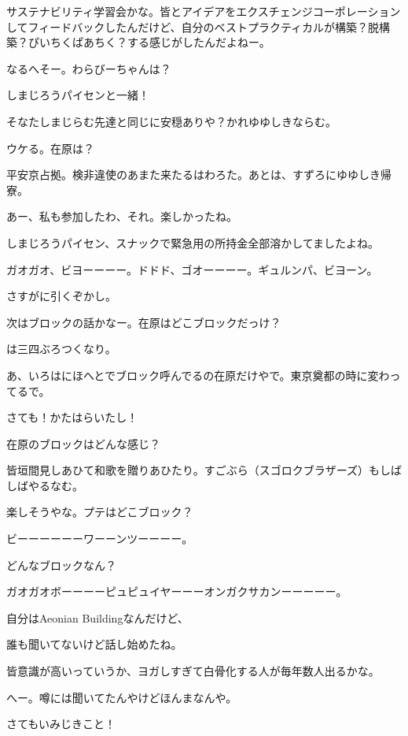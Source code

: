 \begin{multicols}{2}
サステナビリティ学習会かな。皆とアイデアをエクスチェンジコーポレーションしてフィードバックしたんだけど、自分のベストプラクティカルが構築？脱構築？ぴいちくぱあちく？する感じがしたんだよねー。

なるへそー。わらびーちゃんは？

しまじろうパイセンと一緒！

そなたしまじらむ先達と同じに安穏ありや？かれゆゆしきならむ。

ウケる。在原は？

平安京占拠。検非違使のあまた来たるはわろた。あとは、すずろにゆゆしき帰寮。

あー、私も参加したわ、それ。楽しかったね。

しまじろうパイセン、スナックで緊急用の所持金全部溶かしてましたよね。

ガオガオ、ビヨーーーー。ドドド、ゴオーーーー。ギュルンパ、ビヨーン。

さすがに引くぞかし。

次はブロックの話かなー。在原はどこブロックだっけ？

は三四ぶろつくなり。

あ、いろはにほへとでブロック呼んでるの在原だけやで。東京奠都の時に変わってるで。

さても！かたはらいたし！

在原のブロックはどんな感じ？

皆垣間見しあひて和歌を贈りあひたり。すごぶら（スゴロクブラザーズ）もしばしばやるなむ。

楽しそうやな。プテはどこブロック？

ビーーーーーーワーーンツーーーー。

どんなブロックなん？

ガオガオボーーーーピュピュイヤーーーオンガクサカンーーーーー。

自分はAeonian Buildingなんだけど、

誰も聞いてないけど話し始めたね。

皆意識が高いっていうか、ヨガしすぎて白骨化する人が毎年数人出るかな。

へー。噂には聞いてたんやけどほんまなんや。

さてもいみじきこと！


\end{multicols}
